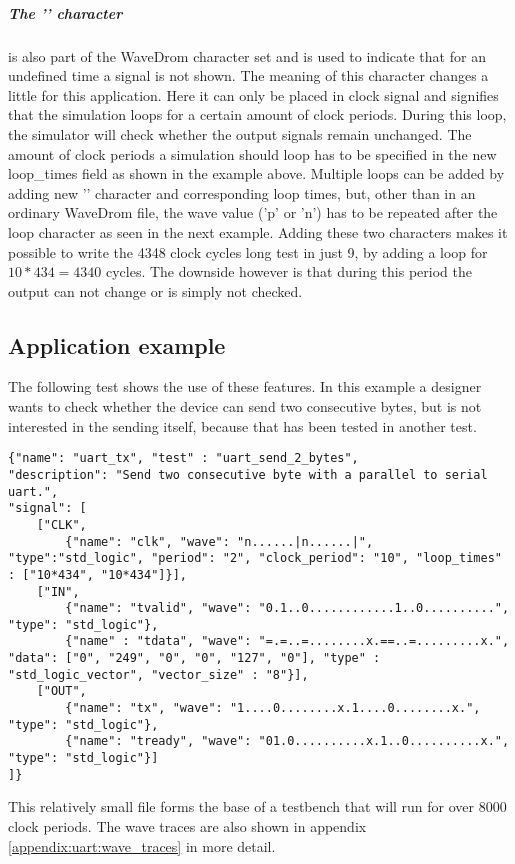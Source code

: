 \subparagraph{The '\textbar' character} is also part of the WaveDrom character set and is used to indicate that for an undefined time a signal is not shown. The meaning of this character changes a little for this application. Here it can only be placed in clock signal and signifies that the simulation loops for a certain amount of clock periods. During this loop, the simulator will check whether the output signals remain unchanged. The amount of clock periods a simulation should loop has to be specified in the new loop\_times field as shown in the example above. Multiple loops can be added by adding new '\textbar' character and corresponding loop times, but, other than in an ordinary WaveDrom file, the wave value ('p' or 'n') has to be repeated after the loop character as seen in the next example.
\npar
Adding these two characters makes it possible to write the 4348 clock cycles long test in just 9, by adding a loop for $10*434 = 4340$ cycles. The downside however is that during this period the output can not change or is simply not checked.
\newpage
\subsection{Application example}
The following test shows the use of these features. In this example a designer wants to check whether the device can send two consecutive bytes, but is not interested in the sending itself, because that has been tested in another test.
\begin{lstlisting}[style=json, caption={Source file for creating third transmission test for the UART design in \ref{appendix:uart}}, label={json:uart_2_bytes}]
{"name": "uart_tx", "test" : "uart_send_2_bytes", 
"description": "Send two consecutive byte with a parallel to serial uart.", 
"signal": [
	["CLK",
		{"name": "clk", "wave": "n......|n......|", "type":"std_logic", "period": "2", "clock_period": "10", "loop_times" : ["10*434", "10*434"]}],
	["IN",
		{"name": "tvalid", "wave": "0.1..0............1..0..........", "type": "std_logic"},
		{"name" : "tdata", "wave": "=.=..=........x.==..=.........x.", "data": ["0", "249", "0", "0", "127", "0"], "type" : "std_logic_vector", "vector_size" : "8"}],
	["OUT",
		{"name": "tx", "wave": "1....0........x.1....0........x.", "type": "std_logic"},
		{"name": "tready", "wave": "01.0..........x.1..0..........x.", "type": "std_logic"}]
]}
\end{lstlisting}\noindent
{}\nline
This relatively small file forms the base of a testbench that will run for over 8000 clock periods. The wave traces are also shown in appendix \ref{appendix:uart:wave_traces} in more detail.
